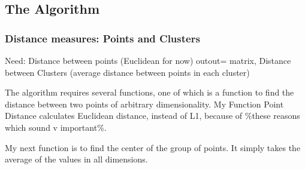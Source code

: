 \documentclass[11pt]{article}
\begin{document}
    \subsection{The Algorithm}\label{the-algorithm}

\subsubsection{Distance measures: Points and
Clusters}\label{distance-measures-points-and-clusters}

Need: Distance between points (Euclidean for now) outout= matrix,
Distance between Clusters (average distance between points in each
cluster)

The algorithm requires several functions, one of which is a function to
find the distance between two points of arbitrary dimensionality. My
Function Point Distance calculates Euclidean distance, instead of L1,
because of \%these reasons which sound v important\%.

My next function is to find the center of the group of points. It simply
takes the average of the values in all dimensions.
\end{document}
